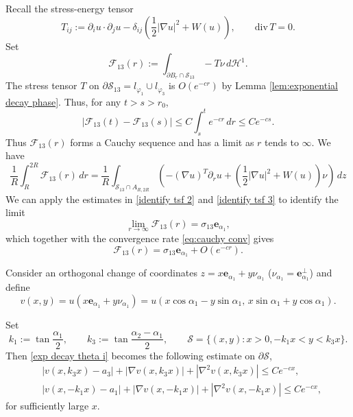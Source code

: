 \documentclass[leqno,11pt]{amsart}
\let\pa=\partial
\let\al=\alpha
\let\f=\frac
\let\pa=\partial
\let\na=\nabla
\theoremstyle{remark}
\newcommand{\ch}{\mathcal{H}^1}
\begin{document}
Recall the stress-energy tensor
\begin{equation*}
        T_{ij}:= \pa_{i} u\cdot\pa_{j}u -\delta_{ij}\left(\f12|\na u|^2+W(u)\right),\qquad \mathrm{div}\, T=0.
    \end{equation*}
Set 
\[
\mathcal{F}_{13}(r):= \int_{\pa B_r\cap\mathcal{S}_{13}} -T\nu\,d\ch.
\]
The stress tensor $T$ on $\pa \mathcal{S}_{13}=l_{\varphi_1}\cup l_{\varphi_3}$ is $O(e^{-cr})$ by Lemma \ref{lem:exponential decay phase}. Thus, for any $ t>s>r_0$,
\begin{equation}\label{eq:cauchy conv} |\mathcal{F}_{13}(t)-\mathcal{F}_{13}(s)|\leq C\int_s^t e^{-cr}\,dr\leq Ce^{-cs}.
\end{equation}
Thus $\mathcal{F}_{13}(r)$ forms a Cauchy sequence and has a limit as $r$ tends to $\infty$. We have 
\begin{equation*}
\f1R\int_R^{2R}\mathcal{F}_{13}(r)\,dr=\frac1R\int_{\mathcal{S}_{13}\cap A_{R,2R}}\left(-(\na u)^T \pa_r u+ (\f12|\na u|^2+W(u))\nu\right)\,dz
\end{equation*}
We can apply the estimates in \eqref{identify tsf 2} and \eqref{identify tsf 3} to identify the limit
\begin{equation}\label{id lim F13}
 \lim_{r\to\infty}\mathcal{F}_{13}(r)= \sigma_{13}\mathbf{e}_{\al_1},
\end{equation}
which together with the convergence rate 
\eqref{eq:cauchy conv} gives
\begin{equation}\label{id lim F13 2}
\mathcal{F}_{13}(r)= \sigma_{13}\mathbf{e}_{\al_1}+O(e^{-cr}).
\end{equation}

Consider an orthogonal change of coordinates $z=x\mathbf{e}_{\al_1}+y \nu_{\al_1}$ ($\nu_{\al_1}=\mathbf{e}_{\al_1}^\perp$) and define 
\begin{equation*}
    v(x,y) = u(x\mathbf{e}_{\al_1}+y \nu_{\al_1})=u(x\cos\al_1 - y\sin\al_1,\, x\sin\al_1 + y\cos\al_1).
\end{equation*}

Set
\[
k_1:=\tan{\f{\al_1}{2}},\qquad  k_3:=\tan{\f{\al_2-\al_1}{2}},\qquad \mathcal{S}=\{(x,y):x>0, -k_1x<y<k_3x\}.
\]
Then \eqref{exp decay theta i} becomes the following estimate on $\pa\mathcal{S}$,
\begin{equation}\label{decay on paS}
\begin{split}
    &|v(x, k_3x)-a_3| +|\na v(x, k_3x)|+|\na^2 v(x, k_3x)| \leq C e^{-cx},\\
    &|v(x, -k_1x)-a_1|+|\na v(x, -k_1x)|+|\na^2 v(x, -k_1x)| \leq C e^{-cx}, 
\end{split}
\end{equation}
for sufficiently large $x$. 
\end{document}
